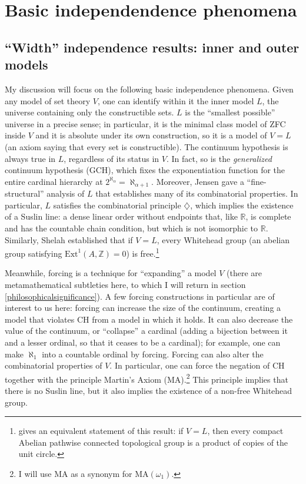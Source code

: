 \documentclass[letterpaper,12pt]{article}
\newcommand{\Z}{\mathbb{Z}}
\begin{document}
\section{Basic independendence phenomena}
\subsection{``Width'' independence results: inner and outer models}
\label{width}
My discussion will focus on the following basic independence phenomena. Given any model of set theory $V$, one can identify within it the inner model $L$, the universe containing only the constructible sets. $L$ is the ``smallest possible'' universe in a precise sense; in particular, it is the minimal class model of ZFC inside $V$ and it is absolute under its own construction, so it is a model of $V=L$ (an axiom saying that every set is constructible). The continuum hypothesis is always true in $L$, regardless of its status in $V$. In fact, so is the \emph{generalized} continuum hypothesis (GCH), which fixes the exponentiation function for the entire cardinal hierarchy at $2^{\aleph_\alpha} = \aleph_{\alpha + 1}$. Moreover, Jensen gave a ``fine-structural'' analysis of $L$ that establishes many of its combinatorial properties. In particular, $L$ satisfies the combinatorial principle $\diamondsuit$, which implies the existence of a Suslin line: a dense linear order without endpoints that, like $\mathbb{R}$, is complete and has the countable chain condition, but which is not isomorphic to $\mathbb{R}$. Similarly, Shelah established that if $V = L$, every Whitehead group (an abelian group satisfying $\mathrm{Ext}^1(A, \Z) = 0$) is free.\footnote{\cite{magidor2012some} gives an equivalent statement of this result: if $V=L$, then every compact Abelian pathwise connected topological group is a product of copies of the unit circle.}

Meanwhile, forcing is a technique for ``expanding'' a model $V$ (there are metamathematical subtleties here, to which I will return in section \ref{philosophicalsignificance}). A few forcing constructions in particular are of interest to us here: forcing can increase the size of the continuum, creating a model that violates CH from a model in which it holds. It can also decrease the value of the continuum, or ``collapse'' a cardinal (adding a bijection between it and a lesser ordinal, so that it ceases to be a cardinal); for example, one can make $\aleph_1$ into a countable ordinal by forcing. Forcing can also alter the combinatorial properties of $V$. In particular, one can force the negation of CH together with the principle Martin's Axiom (MA).\footnote{I will use MA as a synonym for $\mathrm{MA}(\omega_1)$.} This principle implies that there is no Suslin line, but it also implies the existence of a non-free Whitehead group.
\end{document}
